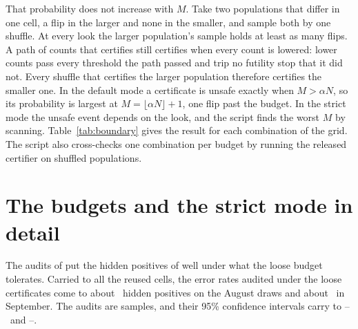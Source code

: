 That probability does not increase with $M$. Take two populations that
differ in one cell, a flip in the larger and none in the smaller, and
sample both by one shuffle. At every look the larger population's sample
holds at least as many flips. A path of counts that certifies still
certifies when every count is lowered: lower counts pass every
threshold the path passed and trip no futility stop that it did not.
Every shuffle that certifies the larger population therefore certifies
the smaller one. In the default mode a certificate is unsafe exactly
when $M > \alpha N$, so its probability is largest at
$M = \lfloor \alpha N \rfloor + 1$, one flip past the budget. In the
strict mode the unsafe event depends on the look, and the script finds
the worst $M$ by scanning. Table~\ref{tab:boundary} gives the result
for each combination of the grid. The script also cross-checks one
combination per budget by running the released certifier on shuffled
populations.

\begin{table}[t]
\caption{The exact probability of an unsafe certificate at the least
favorable fixed population, for each budget and stratum size of the
calibration grid (per-stratum $\delta_j{=}\calNominalDelta$; values
rounded up).}
\label{tab:boundary}
\centering\small
\setlength{\tabcolsep}{4pt}

\end{table}

\FloatBarrier
\keepheading
\section{The budgets and the strict mode in detail}
\label{app:strict}
\begin{table}[t]
\caption{What each budget tolerates and what it buys. Tolerated cells
are $\alpha$ times the \deployFalseStratum\ cells of the corpus-scale
cached-FALSE stratum, also given as a multiple of the
\deployTrueStratum\ rows the column marks TRUE. The corpus-scale
columns are the live September certification of
Table~\ref{tab:deploy}. The last six columns give the certification
rate and the mean savings of the formatting-only edit, in percent over
\bootB\ replications: on the Boolean column in both modes, and on the
select column in the default mode (Table~\ref{tab:main};
Appendix~\ref{app:strict}).}
\label{tab:budgets}
\centering\small
\setlength{\tabcolsep}{4pt}

\end{table}
The audits of  put the hidden positives of
 well under what the loose budget tolerates. Carried
to all the reused cells, the error rates audited under the loose
certificates come to about \deployHiddenLoose\ hidden positives on the
August draws and about \sepHiddenLoose\ in September. The audits are
samples, and their 95\% confidence intervals carry to
\deployHiddenLooseLo--\deployHiddenLooseHi\ and
\sepHiddenLooseLo--\sepHiddenLooseHi.

